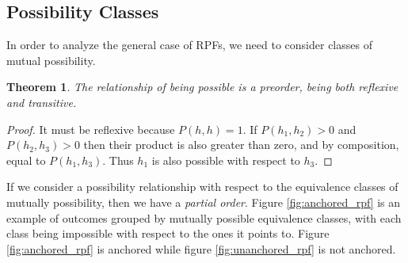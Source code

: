 \documentclass[twoside]{article}
\theoremstyle{plain}%
\newtheorem{theorem}{Theorem}[section]
\theoremstyle{definition}
\theoremstyle{remark}
\begin{document}
\subsection{Possibility Classes}

In order to analyze the general case of RPFs, we need to consider classes of mutual possibility.

\begin{theorem}
The relationship of being possible is a \textit{preorder}, being both reflexive and transitive.
\end{theorem}

\begin{proof}
It must be reflexive because \(P(h, h) = 1\). If \(P(h_1, h_2) > 0\) and \(P(h_2, h_3) > 0\) then their product is also greater than zero, and by composition, equal to \(P(h_1, h_3)\). Thus \(h_1\) is also possible with respect to \(h_3\).
\end{proof}

If we consider a possibility relationship with respect to the equivalence classes of mutually possibility, then we have a \textit{partial order}. Figure \ref{fig:anchored_rpf} is an example of outcomes grouped by mutually possible equivalence classes, with each class being impossible with respect to the ones it points to. Figure \ref{fig:anchored_rpf} is anchored while figure \ref{fig:unanchored_rpf} is not anchored.
\end{document}
